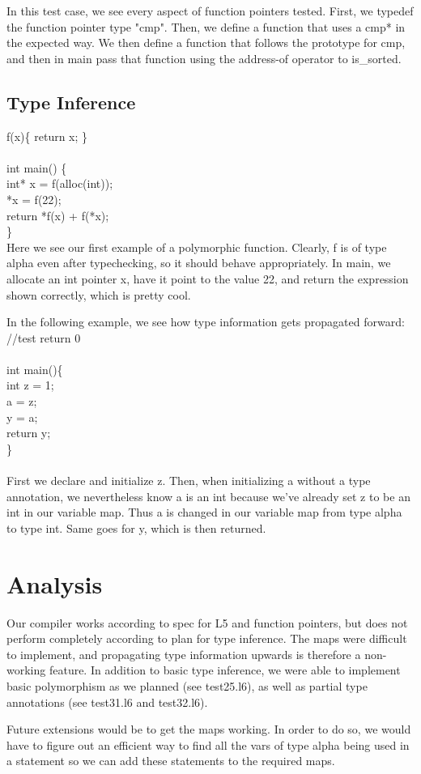 \documentclass{article}
\begin{document}
In this test case, we see every aspect of function pointers tested. First, we typedef the function pointer type "cmp". Then, we define a function that uses a cmp* in the expected way. We then define a function that follows the prototype for cmp, and then in main pass that function using the address-of operator to is\_sorted. 

\subsection{Type Inference}

f(x)\{ return x; \}\\
\\
int main() \{\\
  int* x = f(alloc(int));\\
  *x = f(22);\\
  return *f(x) + f(*x);\\
\}\\

Here we see our first example of a polymorphic function. Clearly, f is of type alpha even after typechecking, so it should behave appropriately. In main, we allocate an int pointer x, have it point to the value 22, and return the expression shown correctly, which is pretty cool.

In the following example, we see how type information gets propagated forward:
\\
//test return 0\\
\\
int main()\{\\
  int z = 1;\\
  a = z;\\
  y = a;\\
  return y;\\
\}\\
\\
First we declare and initialize z. Then, when initializing a without a type annotation, we nevertheless know a is an int because we've already set z to be an int in our variable map. Thus a is changed in our variable map from type alpha to type int. Same goes for y, which is then returned.

\section{Analysis}

Our compiler works according to spec for L5 and function pointers, but does not perform completely according to plan for type inference. The maps were difficult to implement, and propagating type information upwards is therefore a non-working feature. In addition to basic type inference, we were able to implement basic polymorphism as we planned (see test25.l6), as well as partial type annotations (see test31.l6 and test32.l6).

Future extensions would be to get the maps working. In order to do so, we would have to figure out an efficient way to find all the vars of type alpha being used in a statement so we can add these statements to the required maps. 
 
\end{document}
